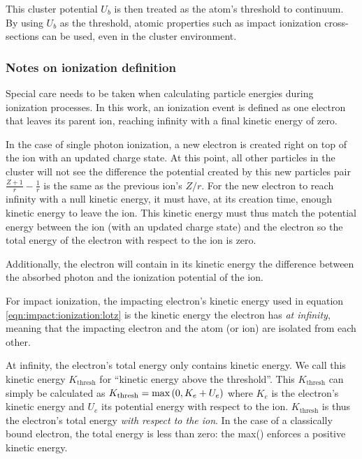 This cluster potential $U_b$ is then treated as the atom's threshold
to continuum. By using $U_b$ as the threshold, atomic properties such as
impact ionization cross-sections can be used, even in the cluster environment.



\subsubsection{Notes on ionization definition}
\label{section:intro:mechanisms:notes}

Special care needs to be taken when calculating particle energies during
ionization processes. In this work, an ionization event is defined as one
electron that leaves its parent ion, reaching infinity with a final kinetic
energy of zero.



In the case of single photon ionization, a new electron is created right on top
of the ion with an updated charge state. At this point, all other particles in
the cluster will not see the difference the potential created by this new
particles pair $\frac{Z+1}{r} - \frac{1}{r}$ is the same as the previous ion's
$Z/r$. For the new electron to reach infinity with a null kinetic energy, it
must have, at its creation time, enough kinetic energy to leave the ion. This
kinetic energy must thus match the potential energy between the ion (with an
updated charge state) and the electron so the total energy of the electron with
respect to the ion is zero.

Additionally, the electron will contain in its kinetic energy the difference
between the absorbed photon and the ionization potential of the ion.


For impact ionization, the impacting electron's kinetic energy used in equation
\eqref{eqn:impact:ionization:lotz} is the kinetic energy the electron has
\textit{at infinity}, meaning that the impacting electron and the atom (or ion)
are isolated from each other.

At infinity, the electron's total energy only contains kinetic
energy. We call this kinetic energy $K_{\textrm{thresh}}$ for ``kinetic energy
above the threshold''. This $K_{\textrm{thresh}}$ can simply be calculated
as $K_{\textrm{thresh}} = \textrm{max}\left( 0, K_e + U_e \right)$
where $K_e$ is the
electron's kinetic energy and $U_e$ its potential energy with respect to the ion.
$K_{\textrm{thresh}}$ is thus the electron's total energy \textit{with respect
to the ion}.
In the case of a classically bound electron, the total energy is less than zero:
the max() enforces a positive kinetic energy.

